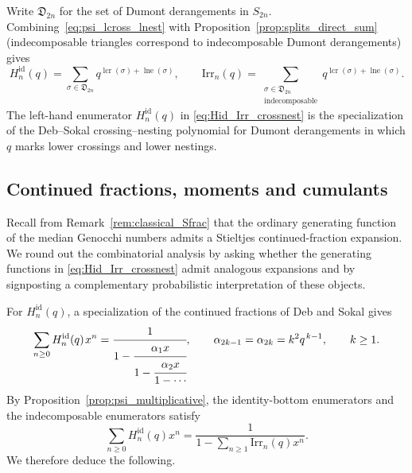 \documentclass[pdftex]{sigma}
\numberwithin{equation}{section}
\newcommand{\ssp}{\hspace{1pt}}
\theoremstyle{definition}
\begin{document}
Write $\mathfrak{D}_{2n}$ for the set of Dumont derangements in $S_{2n}$.
Combining~\eqref{eq:psi_lcross_lnest} with Proposition~\ref{prop:splits_direct_sum}
(indecomposable triangles correspond to indecomposable Dumont
derangements) gives
\begin{equation}
	\label{eq:Hid_Irr_crossnest}
	H_n^{\mathrm{id}}(q)
	=\!\!\sum_{\sigma\in\mathfrak{D}_{2n}}\!\!
	q^{\operatorname{lcr}(\sigma)+\operatorname{lne}(\sigma)},
	\qquad
	\mathrm{Irr}_n(q)
	=\!\!\sum_{\substack{\sigma\in\mathfrak{D}_{2n}\\ \text{indecomposable}}}\!\!
	q^{\operatorname{lcr}(\sigma)+\operatorname{lne}(\sigma)}.
\end{equation}
The left-hand enumerator $H_n^{\mathrm{id}}(q)$ in
\eqref{eq:Hid_Irr_crossnest} is the specialization of the Deb--Sokal
crossing--nesting polynomial for Dumont derangements \cite{DebSokal2024} in
which $q$ marks lower crossings and lower nestings.

\subsection{Continued fractions, moments and cumulants}
\label{subsec:moments_cumulants}

Recall from Remark~\ref{rem:classical_Sfrac} that the ordinary generating
function of the median Genocchi numbers admits a Stieltjes
continued-fraction expansion. We round out the combinatorial analysis by asking whether the
generating functions in \eqref{eq:Hid_Irr_crossnest} admit analogous
expansions and by signposting a complementary probabilistic interpretation of these objects.

For $H_n^{\mathrm{id}}(q)$, a specialization of the continued
fractions of Deb and Sokal \cite{DebSokal2024} gives
\begin{equation}
  \sum_{n\geq0} H_n^{\mathrm{id}}(q)\ssp x^n
  =
  \cfrac{1}{1-\cfrac{\alpha_1x}
  {1-\cfrac{\alpha_2x}
  {1-\cdots}}},
  \qquad
  \alpha_{2k-1}=\alpha_{2k}=k^2q^{\ssp k-1},
  \qquad k\geq1 .
  \label{eq:Hid_Sfrac}
\end{equation}
By Proposition~\ref{prop:psi_multiplicative}, the identity-bottom enumerators
and the indecomposable enumerators satisfy
\begin{equation}
  \sum_{n\geq0}H_n^{\mathrm{id}}(q)x^n
  =
  \frac{1}{
    1-\sum_{n\geq1}\mathrm{Irr}_n(q)x^n
  }.
  \label{eq:boolean_first_return}
\end{equation}
We therefore deduce the following.
\end{document}
